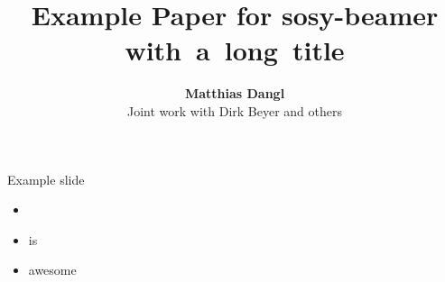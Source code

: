 \documentclass[12pt,english,dvipsnames]{beamer}
\author[Matthias Dangl]{
  {\large\textbf{Matthias Dangl}}\\
  Joint work with Dirk Beyer and others}
\title{\LARGE{Example Paper for sosy-beamer}
  \mbox{with a long title}}
\institute{LMU Munich, Germany}
\date{}
\begin{document}
\begin{frame}
  \titlepage
\end{frame}


%
\begin{frame}{Example slide}
  \begin{itemize}
    \setlength\itemsep{1em}
    \item \cpachecker
    \item is
    \item awesome
  \end{itemize}
\end{frame}

\appendix

\end{document}
